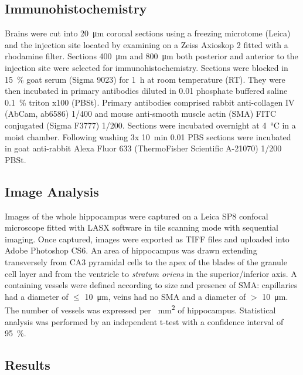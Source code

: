 \documentclass{frontiersFPHY} %
\newcommand{\Ab}{A\textbeta\xspace}
\begin{document}
\subsection{Immunohistochemistry}

Brains were cut into \SI{20}{\micro\metre} coronal sections using a freezing microtome (Leica) and the injection site located by examining on a Zeiss Axioskop 2 fitted with a rhodamine filter. Sections \SI{400}{\micro\metre} and \SI{800}{\micro\metre} both posterior and anterior to the injection site were selected for immunohistochemistry. Sections were blocked in \SI{15}{\percent} goat serum (Sigma 9023) for \SI{1}{\hour} at room temperature (RT). They were then incubated in primary antibodies diluted in \SI{0.01}{\Molar} phosphate buffered saline \SI{0.1}{\percent} triton x100 (PBSt). Primary antibodies comprised rabbit anti-collagen IV (AbCam, ab6586) 1/400 and mouse anti-smooth muscle actin (SMA) FITC conjugated (Sigma F3777) 1/200. Sections were incubated overnight at \SI{4}{\celsius} in a moist chamber. Following washing 3x \SI{10}{\minute} \SI{0.01}{\Molar} PBS sections were incubated in goat anti-rabbit Alexa Fluor 633 (ThermoFisher Scientific A-21070) 1/200 PBSt.

\subsection{Image Analysis}

Images of the whole hippocampus were captured on a Leica SP8 confocal microscope fitted with LASX software in tile scanning mode with sequential imaging. Once captured, images were exported as TIFF files and uploaded into Adobe Photoshop CS6. An area of hippocampus was drawn extending transversely from CA3 pyramidal cells to the apex of the blades of the granule cell layer and from the ventricle to \textit{stratum oriens} in the superior/inferior axis. \Ab containing vessels were defined according to size and presence of SMA: capillaries had a diameter of $\leq$ \SI{10}{\micro\metre}, veins had no SMA and a diameter of $>$ \SI{10}{\micro\metre}. The number of vessels was expressed per \SI{}{\square\milli\metre} of hippocampus. Statistical analysis was performed by an independent t-test with a confidence interval of \SI{95}{\percent}.

\subsection{Results}
\end{document}
